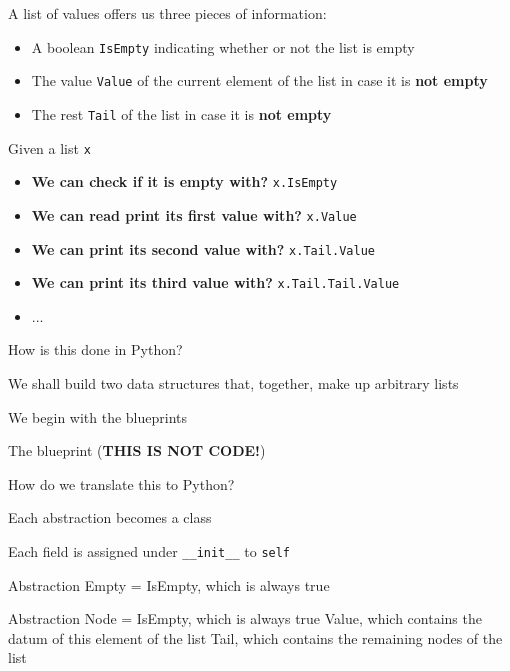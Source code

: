 \documentclass{beamer}
\begin{document}
\begin{slide}{
\item A list of values offers us three pieces of information:
\begin{itemize}
\item A boolean \texttt{IsEmpty} indicating whether or not the list is empty
\item The value \texttt{Value} of the current element of the list in case it is \textbf{not empty}
\item The rest \texttt{Tail} of the list in case it is \textbf{not empty}
\end{itemize}
\item Given a list \texttt{x}
\begin{itemize}
\item \textbf{We can check if it is empty with?} \pause \texttt{x.IsEmpty}
\item \textbf{We can read print its first value with?} \pause \texttt{x.Value}
\item \textbf{We can print its second value with?} \pause \texttt{x.Tail.Value}
\item \textbf{We can print its third value with?} \pause \texttt{x.Tail.Tail.Value}
\item ...
\end{itemize}
}\end{slide}

\begin{slide}{
\item How is this done in Python?
\item We shall build two data structures that, together, make up arbitrary lists
\item We begin with the blueprints
}\end{slide}

\begin{frame}[fragile]{The blueprint (\textbf{THIS IS NOT CODE!})}
\begin{codewithblock}{\pause \item How do we translate this to Python? \pause \item Each abstraction becomes a class \item Each field is assigned under \texttt{\_\_init\_\_} to \texttt{self}}
Abstraction Empty =
  IsEmpty, which is always true

Abstraction Node = 
  IsEmpty, which is always true
  Value, which contains the datum of this element of the list
  Tail, which contains the remaining nodes of the list
\end{codewithblock}
\end{frame}
\end{document}
